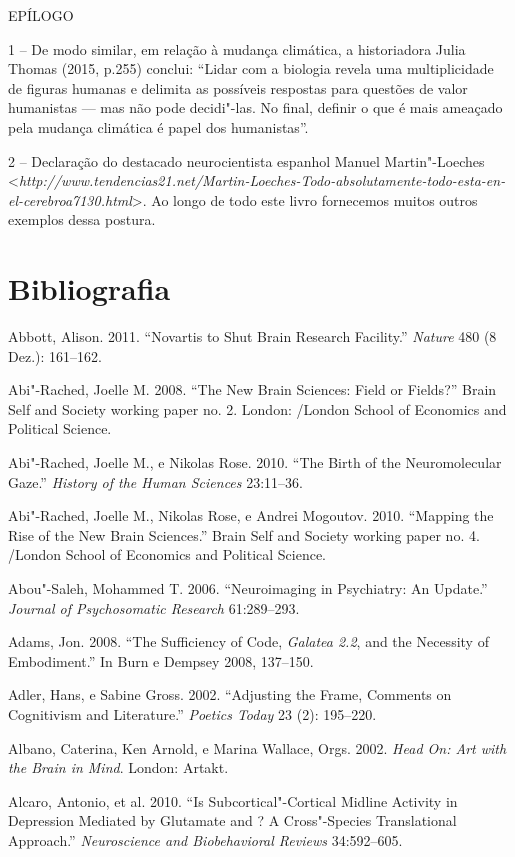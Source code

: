 EPÍLOGO

1 -- De modo similar, em relação à mudança climática, a historiadora
Julia Thomas (2015, p.255) conclui: ``Lidar com a biologia revela uma
multiplicidade de figuras humanas e delimita as possíveis respostas para
questões de valor humanistas --- mas não pode decidi"-las. No final,
definir o que é mais ameaçado pela mudança climática é papel dos
humanistas''.

2 -- Declaração do destacado neurocientista espanhol Manuel
Martin"-Loeches
\textless{}\emph{http://www.tendencias21.net/Martin-Loeches-Todo-absolutamente-todo-esta-en-el-cerebroa7130.html}\textgreater{}.
Ao longo de todo este livro fornecemos muitos outros exemplos dessa
postura.

\chapter{Bibliografia}

Abbott, Alison. 2011. ``Novartis to Shut Brain Research Facility.''
\emph{Nature} 480 (8 Dez.): 161--162.

Abi"-Rached, Joelle M. 2008. ``The New Brain Sciences: Field or Fields?''
Brain Self and Society working paper no. 2. London: /London School
of Economics and Political Science.

Abi"-Rached, Joelle M., e Nikolas Rose. 2010. ``The Birth of the
Neuromolecular Gaze.'' \emph{History of the Human Sciences} 23:11--36.

Abi"-Rached, Joelle M., Nikolas Rose, e Andrei Mogoutov. 2010. ``Mapping
the Rise of the New Brain Sciences.'' Brain Self and Society working
paper no. 4. /London School of Economics and Political Science.

Abou"-Saleh, Mohammed T. 2006. ``Neuroimaging in Psychiatry: An Update.''
\emph{Journal of Psychosomatic Research} 61:289--293.

Adams, Jon. 2008. ``The Sufficiency of Code, \emph{Galatea 2.2}, and the
Necessity of Embodiment.'' In Burn e Dempsey 2008, 137--150.

Adler, Hans, e Sabine Gross. 2002. ``Adjusting the Frame, Comments on
Cognitivism and Literature.'' \emph{Poetics Today} 23 (2): 195--220.

Albano, Caterina, Ken Arnold, e Marina Wallace, Orgs. 2002. \emph{Head
On: Art with the Brain in Mind}. London: Artakt.

Alcaro, Antonio, et al. 2010. ``Is Subcortical"-Cortical Midline Activity
in Depression Mediated by Glutamate and ? A Cross"-Species
Translational Approach.'' \emph{Neuroscience and Biobehavioral Reviews}
34:592--605.

